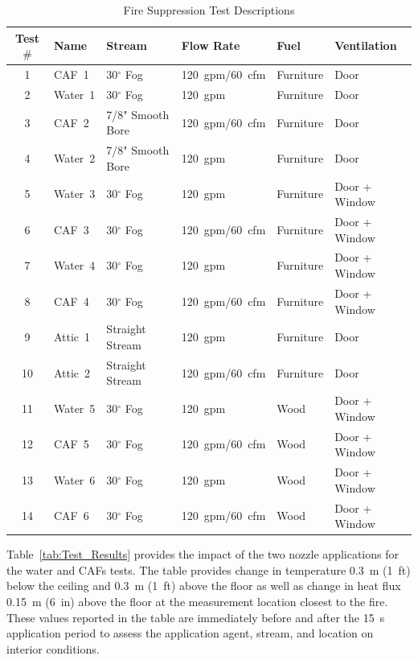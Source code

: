 \documentclass[12pt,oneside]{book}
\begin{document}
\begin{table}[!ht]
\centering
\caption{Fire Suppression Test Descriptions}\label{tab:Test_Descriptions}
\begin{tabular}{clllll}
\toprule[1.5pt]
Test $\#$  & Name	& Stream				& Flow Rate			& Fuel           & Ventilation     \\
\midrule
 1 & CAF~1    &  30$^{\circ}$ Fog  	&  120~gpm/60~cfm   & Furniture      & Door            \\
 2 & Water~1  &  30$^{\circ}$ Fog  	&  120~gpm    		& Furniture      & Door            \\
 3 & CAF~2 	  &  7/8" Smooth Bore  	&  120~gpm/60~cfm   & Furniture      & Door            \\
 4 & Water~2  &  7/8" Smooth Bore  	&  120~gpm    		& Furniture      & Door            \\
 5 & Water~3  &  30$^{\circ}$ Fog  	&  120~gpm    		& Furniture      & Door + Window   \\
 6 & CAF~3    &  30$^{\circ}$ Fog  	&  120~gpm/60~cfm   & Furniture      & Door + Window   \\
 7 & Water~4  &  30$^{\circ}$ Fog  	&  120~gpm    		& Furniture      & Door + Window   \\
 8 & CAF~4    &  30$^{\circ}$ Fog  	&  120~gpm/60~cfm   & Furniture      & Door + Window   \\
 9 & Attic~1  &  Straight Stream  	&  120~gpm    		& Furniture      & Door            \\
10 & Attic~2  &  Straight Stream  	&  120~gpm/60~cfm   & Furniture      & Door            \\
11 & Water~5  &  30$^{\circ}$ Fog  	&  120~gpm   		& Wood           & Door + Window   \\
12 & CAF~5    &  30$^{\circ}$ Fog  	&  120~gpm/60~cfm   & Wood           & Door + Window   \\
13 & Water~6  &  30$^{\circ}$ Fog  	&  120~gpm    		& Wood           & Door + Window   \\
14 & CAF~6    &  30$^{\circ}$ Fog  	&  120~gpm/60~cfm   & Wood           & Door + Window   \\
\bottomrule[1.25pt]
\end{tabular}\par
\end{table}

Table~\ref{tab:Test_Results} provides the impact of the two nozzle applications for the water and CAFs tests. The table provides change in temperature 0.3~m (1~ft) below the ceiling and 0.3~m (1~ft) above the floor as well as change in heat flux 0.15~m (6~in) above the floor at the measurement location closest to the fire. These values reported in the table are immediately before and after the 15~s application period to assess the application agent, stream, and location on interior conditions.
\end{document}
